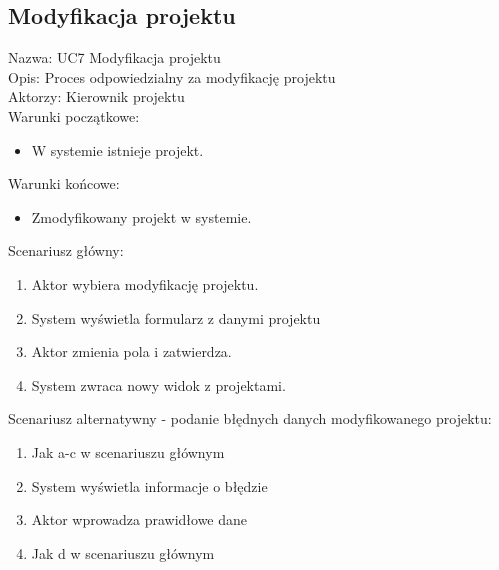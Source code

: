\subsection{Modyfikacja projektu}
Nazwa: UC7 Modyfikacja projektu\\
Opis: Proces odpowiedzialny za modyfikację projektu\\
Aktorzy: Kierownik projektu \\
Warunki początkowe:
\begin{itemize}
\item W systemie istnieje projekt.
\end{itemize}
Warunki końcowe:
\begin{itemize}
\item Zmodyfikowany projekt w systemie.
\end{itemize}
Scenariusz główny:
\begin{enumerate}
\item Aktor wybiera modyfikację projektu.
\item System wyświetla formularz z danymi projektu
\item Aktor zmienia pola i zatwierdza.
\item System zwraca nowy widok z projektami.
\end{enumerate}
Scenariusz alternatywny - podanie błędnych danych modyfikowanego projektu: 
\begin{enumerate}
\item Jak a-c w scenariuszu głównym
\item System wyświetla informacje o błędzie
\item Aktor wprowadza prawidłowe dane
\item Jak d w scenariuszu głównym
\end{enumerate}


